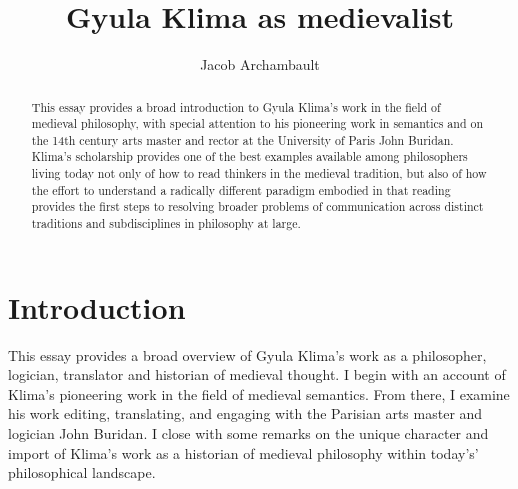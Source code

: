 \documentclass[]{article}
\title{Gyula Klima as medievalist}
\author{Jacob Archambault}
\begin{document}
\maketitle
\begin{abstract}
This essay provides a broad introduction to Gyula Klima's work in the field of medieval philosophy, 
with special attention to 
his pioneering work in semantics 
and on 
the 14th century arts master and rector at the University of Paris 
John Buridan. 
Klima's scholarship 
provides one of the best examples available among philosophers living today not only 
of how to read thinkers in the medieval tradition, 
but also 
of how the effort to understand a radically different paradigm 
embodied in that reading 
provides the first steps 
to resolving broader problems of communication 
across distinct traditions and subdisciplines
in philosophy 
at large.
\end{abstract}

\section{Introduction}
This essay provides 
a broad overview 
of Gyula Klima's work 
as a philosopher, 
logician, 
translator and historian of medieval thought. 
I begin with an account of 
Klima's pioneering work in the field of medieval semantics. 
From there, I examine his work 
editing, 
translating, 
and engaging with 
the Parisian arts master 
and 
logician 
John Buridan. 
I close with some remarks on the unique character and import of Klima's work as a historian of medieval philosophy within today's' philosophical landscape. 
\end{document}
